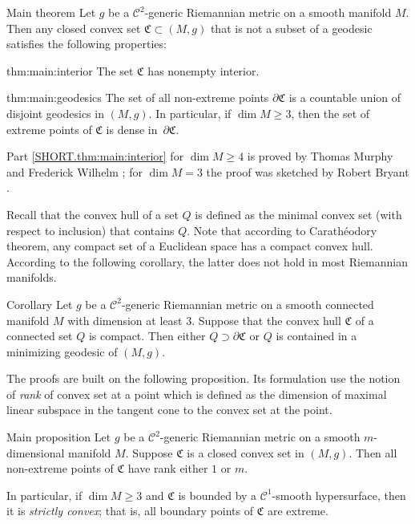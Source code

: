 \documentclass[a4paper,10pt]{article}
\begin{document}
\begin{thm}{Main theorem}\label{thm:main}
Let $g$ be a $\mathcal C^2$-generic Riemannian metric on a smooth manifold $M$.
Then any closed convex set $\mathfrak{C}\subset (M,g)$ that is not a subset of a geodesic
satisfies the following properties:

\begin{subthm}{thm:main:interior}
The set $\mathfrak{C}$ has nonempty interior.
\end{subthm}

\begin{subthm}{thm:main:geodesics}
The set of all non-extreme points $\partial\mathfrak{C}$ is a countable union of disjoint geodesics in $(M,g)$.
In particular, if $\dim M\ge 3$, then the set of
extreme points of $\mathfrak{C}$ is dense in~$\partial\mathfrak{C}$.
\end{subthm}

\end{thm}

Part \ref{SHORT.thm:main:interior} for $\dim M\ge 4$ is proved by Thomas Murphy and Frederick Wilhelm \cite{Wilhelm};
for $\dim M=3$ the proof was sketched by Robert Bryant \cite{Bryant}.

Recall that the convex hull of a set $Q$ is defined as the minimal convex set (with respect to inclusion) that contains $Q$.
Note that according to Carathéodory theorem, any compact set of a Euclidean space has a compact convex hull.
According to the following corollary, the latter does not hold in most Riemannian manifolds.

\begin{thm}{Corollary}\label{cor:caratheodory}
Let $g$ be a $\mathcal C^2$-generic Riemannian metric on a smooth connected manifold $M$ with dimension at least 3.
Suppose that the convex hull $\mathfrak{C}$ of a connected set $Q$ is compact.
Then either $Q\supset \partial \mathfrak{C}$ or $Q$ is contained in a minimizing geodesic of $(M,g)$.
\end{thm}

The proofs are built on the following proposition.
Its formulation use the notion of \emph{rank} of convex set at a point which is defined as the dimension of maximal linear subspace in the tangent cone to the convex set at the point.

\begin{thm}{Main proposition}\label{prom:rank}
Let $g$ be a $\mathcal C^2$-generic Riemannian metric on a smooth $m$-dimensional manifold $M$.
Suppose $\mathfrak{C}$ is a closed convex set in $(M,g)$.
Then all non-extreme points of $\mathfrak{C}$ have rank either $1$ or $m$.

In particular, if $\dim M\ge 3$ and $\mathfrak{C}$ is bounded by a $\mathcal{C}^1$-smooth hypersurface, then it is \emph{strictly convex}; that is, all boundary points of $\mathfrak{C}$ are extreme.
\end{thm}
\end{document}
